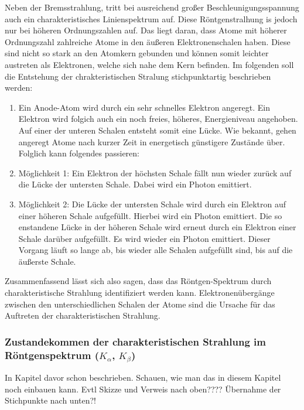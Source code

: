 \documentclass{article}
\begin{document}
    Neben der Bremsstrahlung, tritt bei ausreichend großer Beschleunigungsspannung auch ein charakteristisches Linienspektrum auf. Diese Röntgenstralhung is jedoch nur bei höheren Ordnungszahlen auf. Das liegt daran, dass Atome mit höherer Ordnungszahl zahlreiche Atome in den äußeren Elektronenschalen haben. Diese sind nicht so stark an den Atomkern gebunden und können somit leichter austreten als Elektronen, welche sich nahe dem Kern befinden. Im folgenden soll die Entstehung der chrakteristischen Stralung stichpunktartig beschrieben werden:
    \begin{enumerate}
        \item Ein Anode-Atom wird durch ein sehr schnelles Elektron angeregt. Ein Elektron wird folgich auch ein noch freies, höheres, Energieniveau angehoben. Auf einer der unteren Schalen entsteht somit eine Lücke. Wie bekannt, gehen angeregt Atome nach kurzer Zeit in energetisch günstigere Zustände über. Folglich kann folgendes passieren:
        \item Möglichkeit 1: Ein Elektron der höchsten Schale fällt nun wieder zurück auf die Lücke der untersten Schale. Dabei wird ein Photon emittiert.
        \item Möglichkeit 2: Die Lücke der untersten Schale wird durch ein Elektron auf einer höheren Schale aufgefüllt. Hierbei wird ein Photon emittiert. Die so enstandene Lücke in der höheren Schale wird erneut durch ein Elektron einer Schale darüber aufgefüllt. Es wird wieder ein Photon emittiert. Dieser Vorgang läuft so lange ab, bis wieder alle Schalen aufgefüllt sind, bis auf die äußerste Schale.
    \end{enumerate}

    Zusammenfassend lässt sich also sagen, dass das Röntgen-Spektrum durch charakteristische Strahlung identifiziert werden kann. Elektronenübergänge zwischen den unterschiedlichen Schalen der Atome sind die Ursache für das Auftreten der charakteristischen Strahlung.

    \subsubsection{Zustandekommen der charakteristischen Strahlung im Röntgenspektrum ($K_\alpha$, $K_\beta$)}

    In Kapitel davor schon beschrieben. Schauen, wie man das in diesem Kapitel noch einbauen kann. Evtl Skizze und Verweis nach oben???? Übernahme der Stichpunkte nach unten?!
    
\newpage
\end{document}

